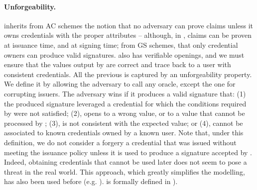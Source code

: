 \paragraph{Unforgeability.} \UAS inherits from AC schemes the notion that no
adversary can prove claims unless it owns credentials with the proper
attributes -- although, in \UAS, claims can be proven at issuance time, and
at signing time; from GS schemes, that only credential owners can produce valid
signatures. \UAS also has verifiable openings, and we must ensure that the
values output by \Open are correct and trace back to a user with consistent
credentials. All the previous is captured by an unforgeability property. We
define it by allowing the adversary to call any oracle, except the one for
corrupting issuers. The adversary wins if it produces a valid signature that:
(1) the produced signature leveraged a credential for
which the conditions required by \fissue were not satisfied; (2), opens to a
wrong value, or to a value that cannot be processed by \Judge; (3), is not
consistent with the expected \Yeval value; or (4), cannot be associated to
known credentials owned by a known user.
%
Note that, under this definition, we do not consider a forgery a credential that
was issued without meeting the issuance policy unless it is used to produce
a signature accepted by \Verify. Indeed, obtaining credentials that cannot be
used later does not seem to pose a threat in the real world. This approach,
which greatly simplifies the modelling, has also been used before (e.g.
\cite{ckl+15}).
%
\ExpForge is formally defined in ).

